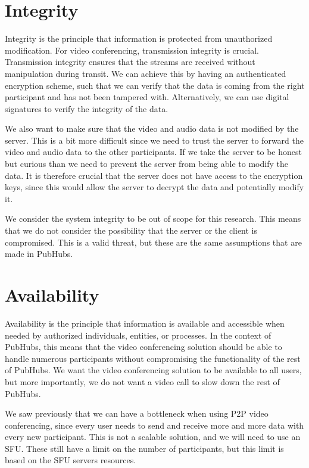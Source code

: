 \documentclass{report}
\begin{document}
\section{Integrity}
Integrity is the principle that information is protected from unauthorized modification. For video conferencing, transmission integrity
is crucial. Transmission integrity ensures that the streams are received without manipulation during transit.
We can achieve this by having an authenticated encryption scheme, such that we can verify that the data is coming from
the right participant and has not been tampered with. Alternatively, we can use digital signatures to verify the
integrity of the data.

We also want to make sure that the video and audio data is not modified by the server. This is a bit more difficult
since we need to trust the server to forward the video and audio data to the other participants. If we take the server
to be honest but curious than we need to prevent the server from being able to modify the data. It is therefore crucial
that the server does not have access to the encryption keys, since this would allow the server to decrypt the data and
potentially modify it.

We consider the system integrity to be out of scope for this research. This means that we do not consider the
possibility that the server or the client is compromised. This is a valid threat, but these are the same assumptions
that are made in PubHubs.

\section{Availability}
Availability is the principle that information is available and accessible when needed by authorized individuals,
entities, or processes. In the context of PubHubs, this means that the video conferencing solution should be able to
handle numerous participants without compromising the functionality of the rest of PubHubs. We want the
video conferencing solution to be available to all users, but more importantly, we do not want a video call to slow
down the rest of PubHubs.

We saw previously that we can have a bottleneck when using P2P video conferencing, since every user needs to send
and receive more and more data with every new participant. This is not a scalable solution, and we will need to use
an SFU. These still have a limit on the number of participants, but this limit is based on the SFU servers resources.
\end{document}
